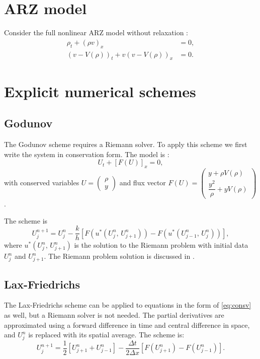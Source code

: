 \documentclass[letterpaper]{article}
\newcommand{\Dt}{\Delta t}
\newcommand{\Dx}{\Delta x}
\begin{document}
\section{ARZ model}

Consider the full nonlinear ARZ model without relaxation \cite{AR, Z}:
\begin{align} 
\rho_t + (\rho v)_x &= 0, \label{ARZ1} \\
(v - V(\rho))_t + v(v - V(\rho))_x &=0. \label{ARZ2}
\end{align}

\section{Explicit numerical schemes}

\subsection{Godunov}

The Godunov scheme requires a Riemann solver. To apply this scheme we first write the system in conservation form. The model is \cite{GodunovARZ}:
\begin{equation} \label{eq:consv}
U_t + [F(U)]_x = 0,
\end{equation}
with conserved variables $U = \begin{pmatrix} \rho \\ y \end{pmatrix}$ and flux vector $F(U) = \begin{pmatrix} y + \rho V(\rho) \\ \dfrac{y^2}{\rho} + y V(\rho) \end{pmatrix}$.

The scheme is 
\begin{equation}
U^{n+1}_j = U^n_j - \dfrac{k}{h}\left[F(u^*(U^n_j, \, U^n_{j+1})) - F(u^*(U^n_{j-1}, \, U^n_j))\right],
\end{equation}
where $u^*(U^n_j, \, U^n_{j+1})$ is the solution to the Riemann problem with initial data $U^n_j$ and $U^n_{j+1}$. The Riemann problem solution is discussed in \cite{GodunovARZ}.

\subsection{Lax-Friedrichs}
The Lax-Friedrichs scheme can be applied to equations in the form of \eqref{eq:consv} as well, but a Riemann solver is not needed. The partial derivatives are approximated using a forward difference in time and central difference in space, and $U^n_j$ is replaced with its spatial average. The scheme is:
\begin{equation}
U^{n+1}_j = \frac{1}{2}[U^n_{j+1} + U^n_{j-1}] - \dfrac{\Dt}{2 \Dx}[F(U^n_{j+1}) - F(U^n_{j-1})].
\end{equation}
\end{document}
